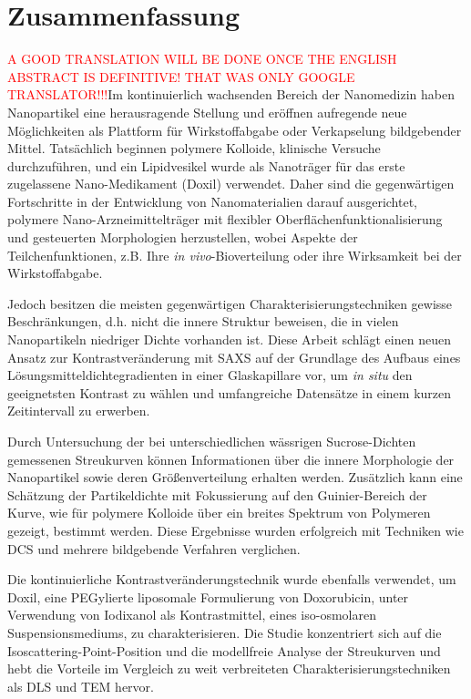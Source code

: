 \cleardoublepage

\thispagestyle{empty}

\chapter*{Zusammenfassung}

\textcolor{red}{A GOOD TRANSLATION WILL BE DONE ONCE THE ENGLISH ABSTRACT IS DEFINITIVE! THAT WAS ONLY GOOGLE TRANSLATOR!!!}Im kontinuierlich wachsenden Bereich der Nanomedizin haben Nanopartikel eine herausragende Stellung und eröffnen aufregende neue Möglichkeiten als Plattform für Wirkstoffabgabe oder Verkapselung bildgebender Mittel. Tatsächlich beginnen polymere Kolloide, klinische Versuche durchzuführen, und ein Lipidvesikel wurde als Nanoträger für das erste zugelassene Nano-Medikament (Doxil) verwendet. Daher sind die gegenwärtigen Fortschritte in der Entwicklung von Nanomaterialien darauf ausgerichtet, polymere Nano-Arzneimittelträger mit flexibler Oberflächenfunktionalisierung und gesteuerten Morphologien herzustellen, wobei Aspekte der Teilchenfunktionen, z.B. Ihre \emph{in vivo}-Bioverteilung oder ihre Wirksamkeit bei der Wirkstoffabgabe.

Jedoch besitzen die meisten gegenwärtigen Charakterisierungstechniken gewisse Beschränkungen, d.h. nicht die innere Struktur beweisen, die in vielen Nanopartikeln niedriger Dichte vorhanden ist. Diese Arbeit schlägt einen neuen Ansatz zur Kontrastveränderung mit SAXS auf der Grundlage des Aufbaus eines Lösungsmitteldichtegradienten in einer Glaskapillare vor, um \emph{in situ} den geeignetsten Kontrast zu wählen und umfangreiche Datensätze in einem kurzen Zeitintervall zu erwerben.

Durch Untersuchung der bei unterschiedlichen wässrigen Sucrose-Dichten gemessenen Streukurven können Informationen über die innere Morphologie der Nanopartikel sowie deren Größenverteilung erhalten werden. Zusätzlich kann eine Schätzung der Partikeldichte mit Fokussierung auf den Guinier-Bereich der Kurve, wie für polymere Kolloide über ein breites Spektrum von Polymeren gezeigt, bestimmt werden. Diese Ergebnisse wurden erfolgreich mit Techniken wie DCS und mehrere bildgebende Verfahren verglichen.

Die kontinuierliche Kontrastveränderungstechnik wurde ebenfalls verwendet, um Doxil, eine PEGylierte liposomale Formulierung von Doxorubicin, unter Verwendung von Iodixanol als Kontrastmittel, eines iso-osmolaren Suspensionsmediums, zu charakterisieren. Die Studie konzentriert sich auf die Isoscattering-Point-Position und die modellfreie Analyse der Streukurven und hebt die Vorteile im Vergleich zu weit verbreiteten Charakterisierungstechniken als DLS und TEM hervor.

